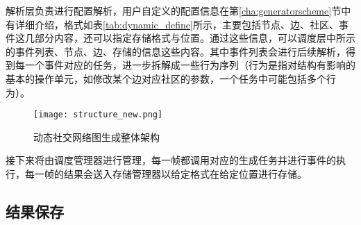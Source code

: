 
解析层负责进行配置解析，用户自定义的配置信息在第\ref{cha:generatorscheme}节中有详细介绍，格式如表\ref{tab:dynamic_define}所示，主要包括节点、边、社区、事件这几部分内容，还可以指定存储格式与位置。通过这些信息，可以调度层中所示的事件列表、节点、边、存储的信息这些内容。其中事件列表会进行后续解析，得到每一个事件对应的任务，进一步拆解成一些行为序列（行为是指对结构有影响的基本的操作单元，如修改某个边对应社区的参数，一个任务中可能包括多个行为）。

\begin{figure}
  \centering
  \texttt{[image: structure\_new.png]}
  \caption{动态社交网络图生成整体架构}
  \label{fig:structure}
\end{figure}

接下来将由调度管理器进行管理，每一帧都调用对应的生成任务并进行事件的执行，每一帧的结果会送入存储管理器以给定格式在给定位置进行存储。

\subsection{结果保存}

